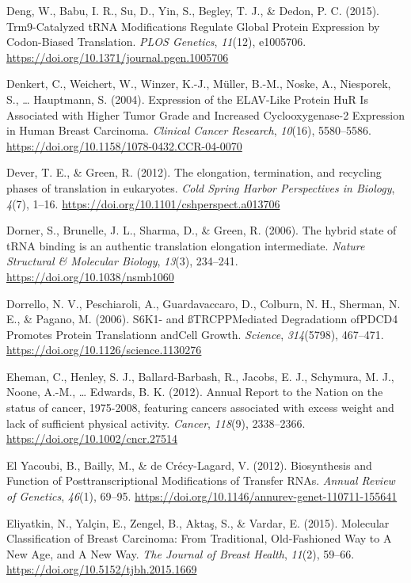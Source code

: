 \documentclass[12pt,openany]{book}
\begin{document}
\hypertarget{ref-Deng2015}{}
Deng, W., Babu, I. R., Su, D., Yin, S., Begley, T. J., \& Dedon, P. C.
(2015). Trm9-Catalyzed tRNA Modifications Regulate Global Protein
Expression by Codon-Biased Translation. \emph{PLOS Genetics},
\emph{11}(12), e1005706.
\url{https://doi.org/10.1371/journal.pgen.1005706}

\hypertarget{ref-Denkert2004}{}
Denkert, C., Weichert, W., Winzer, K.-J., Müller, B.-M., Noske, A.,
Niesporek, S., \ldots{} Hauptmann, S. (2004). Expression of the
ELAV-Like Protein HuR Is Associated with Higher Tumor Grade and
Increased Cyclooxygenase-2 Expression in Human Breast Carcinoma.
\emph{Clinical Cancer Research}, \emph{10}(16), 5580--5586.
\url{https://doi.org/10.1158/1078-0432.CCR-04-0070}

\hypertarget{ref-Dever2012}{}
Dever, T. E., \& Green, R. (2012). The elongation, termination, and
recycling phases of translation in eukaryotes. \emph{Cold Spring Harbor
Perspectives in Biology}, \emph{4}(7), 1--16.
\url{https://doi.org/10.1101/cshperspect.a013706}

\hypertarget{ref-Dorner2006}{}
Dorner, S., Brunelle, J. L., Sharma, D., \& Green, R. (2006). The hybrid
state of tRNA binding is an authentic translation elongation
intermediate. \emph{Nature Structural \& Molecular Biology},
\emph{13}(3), 234--241. \url{https://doi.org/10.1038/nsmb1060}

\hypertarget{ref-Dorrello2006}{}
Dorrello, N. V., Peschiaroli, A., Guardavaccaro, D., Colburn, N. H.,
Sherman, N. E., \& Pagano, M. (2006). S6K1- and ßTRCPPMediated
Degradationn ofPDCD4 Promotes Protein Translationn andCell Growth.
\emph{Science}, \emph{314}(5798), 467--471.
\url{https://doi.org/10.1126/science.1130276}

\hypertarget{ref-Eheman2012}{}
Eheman, C., Henley, S. J., Ballard-Barbash, R., Jacobs, E. J., Schymura,
M. J., Noone, A.-M., \ldots{} Edwards, B. K. (2012). Annual Report to
the Nation on the status of cancer, 1975-2008, featuring cancers
associated with excess weight and lack of sufficient physical activity.
\emph{Cancer}, \emph{118}(9), 2338--2366.
\url{https://doi.org/10.1002/cncr.27514}

\hypertarget{ref-ElYacoubi2012}{}
El Yacoubi, B., Bailly, M., \& de Crécy-Lagard, V. (2012). Biosynthesis
and Function of Posttranscriptional Modifications of Transfer RNAs.
\emph{Annual Review of Genetics}, \emph{46}(1), 69--95.
\url{https://doi.org/10.1146/annurev-genet-110711-155641}

\hypertarget{ref-Eliyatkin2015}{}
Eliyatkin, N., Yalçin, E., Zengel, B., Aktaş, S., \& Vardar, E. (2015).
Molecular Classification of Breast Carcinoma: From Traditional,
Old-Fashioned Way to A New Age, and A New Way. \emph{The Journal of
Breast Health}, \emph{11}(2), 59--66.
\url{https://doi.org/10.5152/tjbh.2015.1669}
\end{document}
